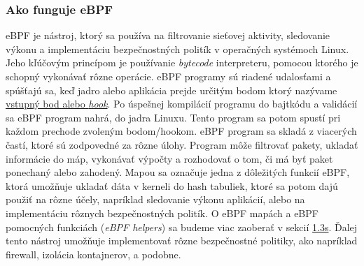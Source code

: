 \subsubsection{Ako funguje eBPF} 
eBPF je nástroj, ktorý sa používa na filtrovanie sieťovej aktivity, sledovanie výkonu a implementáciu bezpečnostných politík v operačných systémoch Linux. 
Jeho kľúčovým princípom je používanie \emph{bytecode} interpreteru, pomocou ktorého je schopný vykonávať rôzne operácie. eBPF programy sú riadené udalosťami a 
spúšťajú sa, keď jadro alebo aplikácia prejde určitým bodom ktorý nazývame \hyperref[sec:hooks]{vstupný bod alebo \emph{hook}}.  Po úspešnej kompilácií 
programu do bajtkódu a validácií sa eBPF program nahrá, do jadra Linuxu. Tento program sa potom spustí pri každom prechode zvoleným bodom/hookom. 
eBPF program sa skladá z viacerých častí, ktoré sú zodpovedné za rôzne úlohy. Program môže filtrovať pakety, ukladať informácie do máp, vykonávať výpočty 
a rozhodovať o tom, či má byť paket ponechaný alebo zahodený. Mapou sa označuje jedna z dôležitých funkcií eBPF, ktorá umožňuje ukladať dáta v kerneli 
do hash tabuliek, ktoré sa potom dajú použiť na rôzne účely, napríklad sledovanie výkonu aplikácií, alebo na implementáciu rôznych bezpečnostných politík. 
O eBPF mapách a eBPF pomocných funkciách (\emph{eBPF helpers}) sa budeme viac zaoberať v sekcií \hyperref[sec:architecture]{1.3s}. 
Ďalej tento nástroj umožňuje implementovať rôzne bezpečnostné politiky, ako napríklad firewall, izolácia kontajnerov, a podobne.

